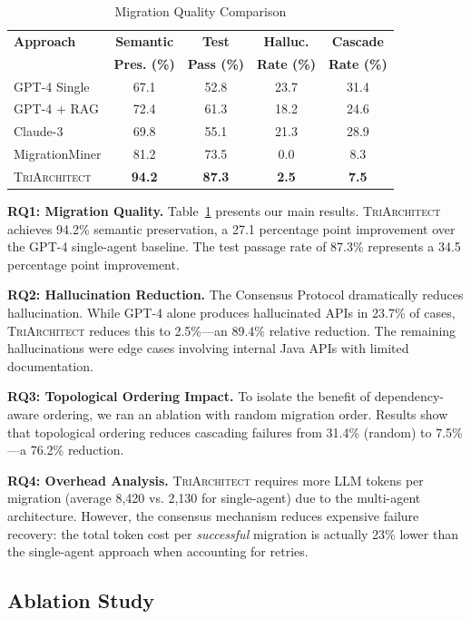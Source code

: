 \documentclass[sigconf,review,anonymous]{acmart}
\begin{document}
\begin{table}[t]
\caption{Migration Quality Comparison}
\label{tab:results}
\begin{tabular}{lcccc}
\toprule
\textbf{Approach} & \textbf{Semantic} & \textbf{Test} & \textbf{Halluc.} & \textbf{Cascade} \\
 & \textbf{Pres. (\%)} & \textbf{Pass (\%)} & \textbf{Rate (\%)} & \textbf{Rate (\%)} \\
\midrule
GPT-4 Single & 67.1 & 52.8 & 23.7 & 31.4 \\
GPT-4 + RAG & 72.4 & 61.3 & 18.2 & 24.6 \\
Claude-3 & 69.8 & 55.1 & 21.3 & 28.9 \\
MigrationMiner & 81.2 & 73.5 & 0.0 & 8.3 \\
\midrule
\textsc{TriArchitect} & \textbf{94.2} & \textbf{87.3} & \textbf{2.5} & \textbf{7.5} \\
\bottomrule
\end{tabular}
\end{table}

\textbf{RQ1: Migration Quality.} Table~\ref{tab:results} presents our main results. \textsc{TriArchitect} achieves 94.2\% semantic preservation, a 27.1 percentage point improvement over the GPT-4 single-agent baseline. The test passage rate of 87.3\% represents a 34.5 percentage point improvement.

\textbf{RQ2: Hallucination Reduction.} The Consensus Protocol dramatically reduces hallucination. While GPT-4 alone produces hallucinated APIs in 23.7\% of cases, \textsc{TriArchitect} reduces this to 2.5\%---an 89.4\% relative reduction. The remaining hallucinations were edge cases involving internal Java APIs with limited documentation.

\textbf{RQ3: Topological Ordering Impact.} To isolate the benefit of dependency-aware ordering, we ran an ablation with random migration order. Results show that topological ordering reduces cascading failures from 31.4\% (random) to 7.5\%---a 76.2\% reduction.

\textbf{RQ4: Overhead Analysis.} \textsc{TriArchitect} requires more LLM tokens per migration (average 8,420 vs. 2,130 for single-agent) due to the multi-agent architecture. However, the consensus mechanism reduces expensive failure recovery: the total token cost per \textit{successful} migration is actually 23\% lower than the single-agent approach when accounting for retries.

\subsection{Ablation Study}
\end{document}
